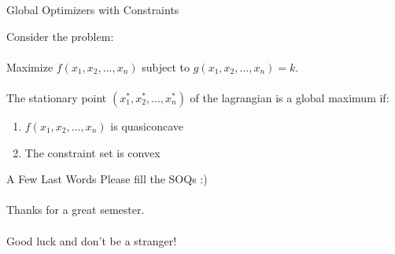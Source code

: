 \documentclass{./../../Latex/teaching_slides}
\begin{document}
\begin{frame}{Global Optimizers with Constraints}

Consider the problem:\\~\\
Maximize $f(x_1,x_2,...,x_n)$ subject to $g(x_1, x_2,...,x_n)=k$.\\~\\

The stationary point $(x_1^*, x_2^*, ..., x_n^*)$ of the lagrangian is a global maximum if:
\begin{enumerate}
  \item $f(x_1,x_2,...,x_n)$ is quasiconcave
  \item The constraint set is convex
\end{enumerate}
\end{frame}

\begin{frame}{\vspace{1em} \huge A Few Last Words}
\vspace{0.7em}
\large \centering
Please fill the SOQs :) \\~\\
Thanks for a great
semester. \\~\\
Good luck and don’t be a stranger!
\end{frame}
\end{document}
